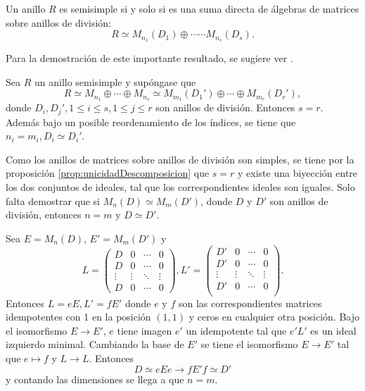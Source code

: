 \begin{teorema}
Un anillo $R$ es semisimple si y solo si es una suma directa de álgebras de matrices sobre anillos de división:
\[ R \simeq M_{n_1}(D_1)\oplus \cdots \cdots M_{n_s}(D_s).  \]
\end{teorema}
Para la demostración de este importante resultado, se sugiere ver \cite[200]{bib:AlgebraPostGrado}.
\begin{teorema}
Sea $R$ un anillo semisimple y supóngase que 
\[ R \simeq M_{n_1} \oplus \cdots \oplus M_{n_s} \simeq M_{m_1}(D_1')\oplus \cdots \oplus M_{m_r}(D_r'), \] donde $D_i, D_j', 1 \leq i \leq s, 1 \leq j \leq r$ son anillos de división. Entonces $s = r$. Además bajo un posible reordenamiento de los índices, se tiene que $n_i = m_i, D_i \simeq D_i'$. 
\end{teorema} \newpage
\begin{proof*}
Como los anillos de matrices sobre anillos de división son simples, se tiene por la proposición \ref{prop:unicidadDescomposicion} que $s = r$ y existe una biyección entre los dos conjuntos de ideales, tal que los correspondientes ideales son iguales. Solo falta demostrar que si $M_n(D)\simeq M_m(D')$, donde $D$ y $D'$ son anillos de división, entonces $n = m$ y $D \simeq D'$.

Sea $E = M_n(D)$, $E' = M_m(D')$ y 
\[ L = \begin{pmatrix} 
D &  0 & \cdots & 0 \\
D &  0 & \cdots & 0 \\
\vdots &\vdots& \ddots &\vdots \\
 D &  0 & \cdots & 0
\end{pmatrix} , L'=\begin{pmatrix}
D' & 0 & \cdots & 0\\
D' & 0 & \cdots & 0\\
\vdots &\vdots& \ddots &\vdots \\
D' & 0 & \cdots & 0\\
\end{pmatrix}.\]
\indent Entonces $L = eE, L'= fE'$ donde $e$ y $f$ son las correspondientes matrices idempotentes con 1 en la posición $(1,1)$ y ceros en cualquier otra posición. Bajo el isomorfismo $E \to E'$, $e$ tiene imagen $e'$ un idempotente tal que $e'L'$ es un ideal izquierdo minimal. Cambiando la base de $E'$ se tiene el isomorfismo $E \to E'$ tal que $e \mapsto f$ y $L \to L$. Entonces \[ D \simeq eEe \to fE'f \simeq D' \] y contando las dimensiones se llega a que $n = m$.  
\end{proof*}
